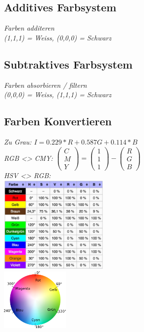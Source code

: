 \subsection{Additives Farbsystem}

\textit{Farben additeren} \\
\textit{(1,1,1) = Weiss, (0,0,0) = Schwarz}

\subsection{Subtraktives Farbsystem}

\textit{Farben absorbieren / filtern} \\ 
\textit{(0,0,0) = Weiss, (1,1,1) = Schwarz}

\subsection{Farben Konvertieren}

\textit{Zu Grau: $I = 0.229*R+0.587G+0.114*B$} \\

\textit{RGB <> CMY: }
$\begin{pmatrix} C \\ M \\ Y \end{pmatrix} =
\begin{pmatrix} 1 \\ 1 \\ 1 \end{pmatrix} -
\begin{pmatrix} R \\ G \\ B \end{pmatrix}$ \\

\textit{HSV <> RGB: }\\
\includegraphics[width=0.4\textwidth]{assets/hsv-rgb.png}
\\
\includegraphics[width=0.25\textwidth]{assets/hsv_hue.png}

